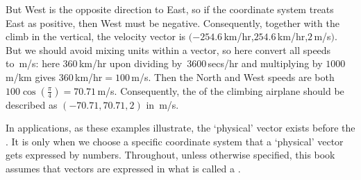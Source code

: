 {\begin{example}
But West is the opposite direction to East, so if the coordinate system treats East as positive, then West must be negative.
Consequently, together with the climb in the vertical, the velocity vector is \((-254.6\)\,km/hr,\(254.6\)\,km/hr,\(2\,\)m/s\()\).
But we should avoid mixing units within a vector, so here convert all speeds to~m/s: here \(360\)\,km/hr upon dividing by~\(3600\)\,secs/hr and multiplying by \(1000\)\,m/km gives \(360\)\,km/hr\({}=100\)\,m/s.
Then the North and West speeds are both \(100\cos(\tfrac\pi4)=70.71\)\,m/s.
Consequently, the  of the climbing airplane should be described as \((-70.71,70.71,2)\) in~m/s.
\end{example}
}%


In applications, as these examples illustrate, the `physical' vector exists before the .
It is only when we choose a specific coordinate system that a `physical' vector gets expressed by numbers.
Throughout, unless otherwise specified, this book assumes that vectors are expressed in what is called a .
